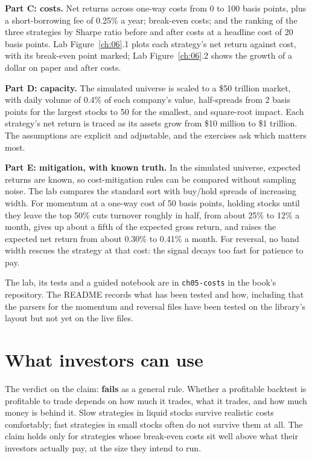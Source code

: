 \textbf{Part C: costs.} Net returns across one-way costs from 0 to 100 basis points, plus a short-borrowing fee of 0.25\% a year; break-even costs; and the ranking of the three strategies by Sharpe ratio before and after costs at a headline cost of 20 basis points. Lab Figure~\ref{ch:06}.1 plots each strategy's net return against cost, with its break-even point marked; Lab Figure~\ref{ch:06}.2 shows the growth of a dollar on paper and after costs.

\textbf{Part D: capacity.} The simulated universe is scaled to a \$50 trillion market, with daily volume of 0.4\% of each company's value, half-spreads from 2 basis points for the largest stocks to 50 for the smallest, and square-root impact. Each strategy's net return is traced as its assets grow from \$10 million to \$1 trillion. The assumptions are explicit and adjustable, and the exercises ask which matters most.

\textbf{Part E: mitigation, with known truth.} In the simulated universe, expected returns are known, so cost-mitigation rules can be compared without sampling noise. The lab compares the standard sort with buy/hold spreads of increasing width. For momentum at a one-way cost of 50 basis points, holding stocks until they leave the top 50\% cuts turnover roughly in half, from about 25\% to 12\% a month, gives up about a fifth of the expected gross return, and raises the expected net return from about 0.30\% to 0.41\% a month. For reversal, no band width rescues the strategy at that cost: the signal decays too fast for patience to pay.

The lab, its tests and a guided notebook are in \texttt{ch05-costs} in the book's repository. The README records what has been tested and how, including that the parsers for the momentum and reversal files have been tested on the library's layout but not yet on the live files.

\section{What investors can use}
\label{sec:06-investors}

The verdict on the claim: \textbf{fails} as a general rule. Whether a profitable backtest is profitable to trade depends on how much it trades, what it trades, and how much money is behind it. Slow strategies in liquid stocks survive realistic costs comfortably; fast strategies in small stocks often do not survive them at all. The claim holds only for strategies whose break-even costs sit well above what their investors actually pay, at the size they intend to run.

